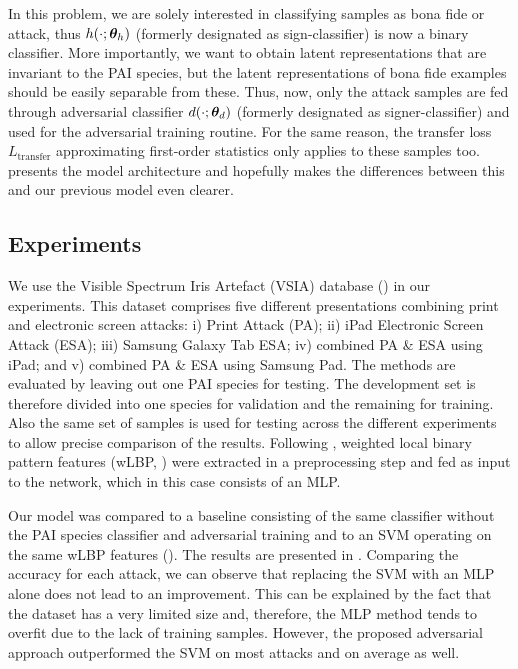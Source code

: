 In this problem, we are solely interested in classifying samples as bona fide or attack, thus $h(\cdot;{\bm{\theta}}_h)$ (formerly designated as sign-classifier) is now a binary classifier. More importantly, we want to obtain latent representations that are invariant to the PAI species, but the latent representations of bona fide examples should be easily separable from these. Thus, now, only the attack samples are fed through adversarial classifier $d(\cdot;{\bm{\theta}}_d)$ (formerly designated as signer-classifier) and used for the adversarial training routine. For the same reason, the transfer loss $L_{\text{transfer}}$ approximating first-order statistics only applies to these samples too.  presents the model architecture and hopefully makes the differences between this and our previous model even clearer.



\subsection{Experiments}
\label{sec:adv_iris_attack_experiments}
We use the Visible Spectrum Iris Artefact (VSIA) database (\citet{raghavendra2015VSIA}) in our experiments. This dataset comprises five different presentations combining print and electronic screen attacks: i) Print Attack (PA); ii) iPad Electronic Screen Attack (ESA); iii) Samsung Galaxy Tab ESA; iv) combined PA \& ESA using iPad; and v) combined PA \& ESA using Samsung Pad. The methods are evaluated by leaving out one PAI species for testing. The development set is therefore divided into one species for validation and the remaining for training. Also the same set of samples is used for testing across the different experiments to allow precise comparison of the results. Following \citet{sequeira2016realistic}, weighted local binary pattern features (wLBP, \citet{zhang2010contact}) were extracted in a preprocessing step and fed as input to the network, which in this case consists of an MLP.

Our model was compared to a baseline consisting of the same classifier without the PAI species classifier and adversarial training and to an SVM operating on the same wLBP features (\citet{sequeira2016realistic}). The results are presented in . Comparing the accuracy for each attack, we can observe that  replacing the SVM with an MLP alone does not lead to an improvement. This can be explained by the fact that the dataset has a very limited size and, therefore, the MLP method tends to overfit due to the lack of training samples. However, the proposed adversarial approach outperformed the SVM on most attacks and on average as well.

